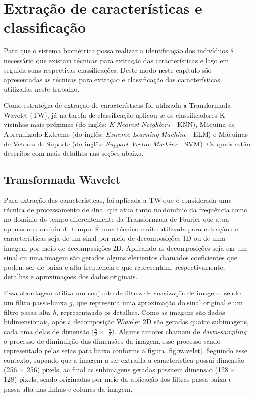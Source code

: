 \chapter{Extração de características e classificação}
\label{cp:6_extracao}
Para que o sistema biométrico possa realizar a identificação dos indivíduos é necessário que existam técnicas para extração das características e logo em seguida suas respectivas classificações. Deste modo neste capítulo são apresentadas as técnicas para extração e classificação das características utilizadas neste trabalho.

Como estratégia de extração de características foi utilizada a Transformada Wavelet (TW), já na tarefa de classificação aplicou-se os classificadores K-vizinhos mais próximos (do inglês: \textit{K Nearest Neighbors} - KNN), Máquina de Aprendizado Extremo (do inglês: \textit{Extreme Learning Machine} - ELM) e Máquinas de Vetores de Suporte (do inglês: \textit{Support Vector Machine} - SVM). Os quais estão descritos com mais detalhes nas seções abaixo. 

\section{Transformada Wavelet}
\label{sec:Transformada Wavelet}
Para extração das características, foi aplicada a TW \cite{mallat1989theory} que é considerada uma técnica de processamento de sinal que atua tanto no domínio da frequência como no domínio do tempo diferentemente da Transformada de Fourier que atua apenas no domínio do tempo. É uma técnica muito utilizada para extração de características seja de um sinal por meio de decomposições 1D ou de uma imagem por meio de decomposições 2D. Aplicando as decomposições seja em um sinal ou uma imagem são gerados alguns elementos chamados coeficientes que podem ser de baixa e alta frequência e que representam, respectivamente, detalhes e aproximações dos dados originais. 

Essa abordagem utiliza um conjunto de filtros de suavização de imagem, sendo um filtro passa-baixa \textit{g}, que representa uma aproximação do sinal original e um filtro passa-alta \textit{h}, representando os detalhes. Como as imagens são dados bidimensionais,
após a decomposição Wavelet 2D são geradas quatro subimagens, cada  uma delas de dimensão  $(\frac{n}{2} \times$  $\frac{n}{2})$. Alguns autores chamam de \textit{down-sampling} o processo de diminuição das dimensões da imagem, esse processo sendo representado pelas setas para baixo conforme a figura \ref{fig:wavelet}. Seguindo esse contexto, supondo que a imagem a ser extraída a característica possui dimensão (256 $\times$ 256) pixels, ao final as subimagens geradas possuem dimensão (128 $\times$ 128) pixels, sendo originadas por meio da aplicação dos filtros passa-baixa e passa-alta nas linhas e colunas da imagem.


